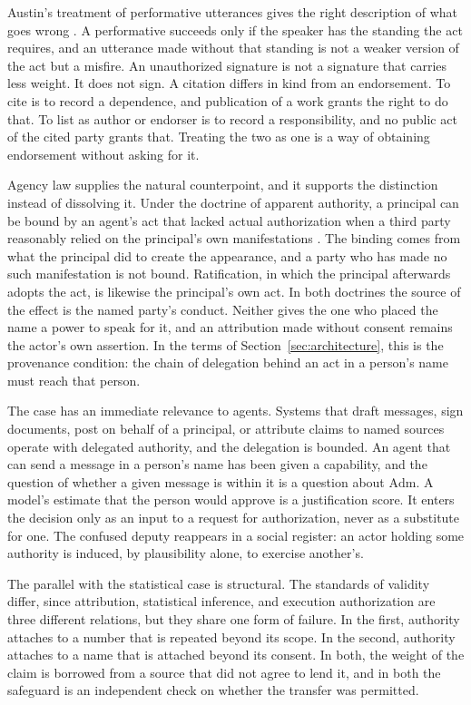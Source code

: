 \documentclass[11pt]{article}
\theoremstyle{definition}
\theoremstyle{remark}
\newcommand{\Adm}{\mathrm{Adm}}
\begin{document}
Austin's treatment of performative utterances gives the right description of what goes wrong \cite{austin1962}. A performative succeeds only if the speaker has the standing the act requires, and an utterance made without that standing is not a weaker version of the act but a misfire. An unauthorized signature is not a signature that carries less weight. It does not sign. A citation differs in kind from an endorsement. To cite is to record a dependence, and publication of a work grants the right to do that. To list as author or endorser is to record a responsibility, and no public act of the cited party grants that. Treating the two as one is a way of obtaining endorsement without asking for it.

Agency law supplies the natural counterpoint, and it supports the distinction instead of dissolving it. Under the doctrine of apparent authority, a principal can be bound by an agent's act that lacked actual authorization when a third party reasonably relied on the principal's own manifestations \cite{restatement2006}. The binding comes from what the principal did to create the appearance, and a party who has made no such manifestation is not bound. Ratification, in which the principal afterwards adopts the act, is likewise the principal's own act. In both doctrines the source of the effect is the named party's conduct. Neither gives the one who placed the name a power to speak for it, and an attribution made without consent remains the actor's own assertion. In the terms of Section~\ref{sec:architecture}, this is the provenance condition: the chain of delegation behind an act in a person's name must reach that person.

The case has an immediate relevance to agents. Systems that draft messages, sign documents, post on behalf of a principal, or attribute claims to named sources operate with delegated authority, and the delegation is bounded. An agent that can send a message in a person's name has been given a capability, and the question of whether a given message is within it is a question about $\Adm$. A model's estimate that the person would approve is a justification score. It enters the decision only as an input to a request for authorization, never as a substitute for one. The confused deputy reappears in a social register: an actor holding some authority is induced, by plausibility alone, to exercise another's.

The parallel with the statistical case is structural. The standards of validity differ, since attribution, statistical inference, and execution authorization are three different relations, but they share one form of failure. In the first, authority attaches to a number that is repeated beyond its scope. In the second, authority attaches to a name that is attached beyond its consent. In both, the weight of the claim is borrowed from a source that did not agree to lend it, and in both the safeguard is an independent check on whether the transfer was permitted.
\end{document}
